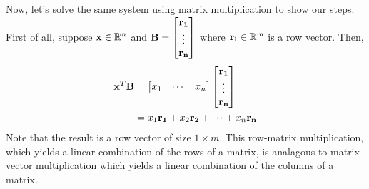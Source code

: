 \documentclass[../main.tex]{subfiles}
\begin{document}
\begin{solution}
	Now, let's solve the same system using matrix multiplication to show our steps.
	First of all, suppose $\mathbf{x} \in \mathbb{R}^n$ and $\mathbf{B}=\begin{bmatrix}\mathbf{r_1}\\\vdots\\\mathbf{r_n}\end{bmatrix}$
	where $\mathbf{r_i} \in \mathbb{R}^m$ is a row vector. Then,
	\begin{align*}
		\mathbf{x}^T\mathbf{B} & =\begin{bmatrix}x_1&\cdots&x_n\end{bmatrix}\begin{bmatrix}\mathbf{r_1}\\\vdots\\\mathbf{r_n}\end{bmatrix} \\
		                   & =x_1\mathbf{r_1}+x_2\mathbf{r_2}+\cdots +x_n\mathbf{r_n}
	\end{align*}
	Note that the result is a row vector of size $1\times m$. This row-matrix
	multiplication, which yields a linear combination of the rows of a matrix,
	is analagous to matrix-vector multiplication which yields a linear
	combination of the columns of a matrix.


\end{solution}
\end{document}
